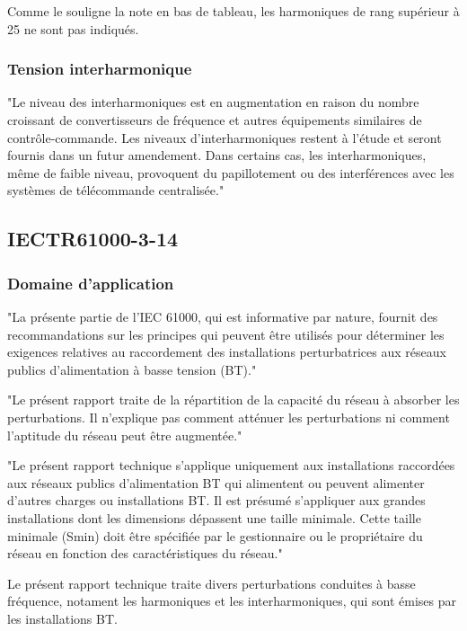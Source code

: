 Comme le souligne la note en bas de tableau, les harmoniques de rang supérieur à 25 ne sont pas indiqués.





\subsubsection{Tension interharmonique}

"Le niveau des interharmoniques est en augmentation en raison du nombre croissant de convertisseurs de fréquence et autres équipements similaires de contrôle-commande. Les niveaux d'interharmoniques restent à l'étude et seront fournis dans un futur amendement.
Dans certains cas, les interharmoniques, même de faible niveau, provoquent du papillotement ou des interférences avec les systèmes de télécommande centralisée."




\subsection{IECTR61000-3-14}


\subsubsection{Domaine d'application}
"La présente partie de l'IEC 61000, qui est informative par nature, fournit des recommandations sur les principes qui peuvent être utilisés pour déterminer les exigences relatives au raccordement des installations perturbatrices aux réseaux publics d'alimentation à basse tension (BT)."

"Le présent rapport traite de la répartition de la capacité du réseau à absorber les perturbations. Il n'explique pas comment atténuer les perturbations ni comment l'aptitude du réseau peut être augmentée."

"Le présent rapport technique s'applique uniquement aux installations raccordées aux réseaux publics d'alimentation BT qui alimentent ou peuvent alimenter d'autres charges ou installations BT. Il est présumé s'appliquer aux grandes installations dont les dimensions dépassent une taille minimale. Cette taille minimale (Smin) doit être spécifiée par le gestionnaire ou le propriétaire du réseau en fonction des caractéristiques du réseau."


Le présent rapport technique traite divers perturbations conduites à basse fréquence, notament les harmoniques et les interharmoniques, qui sont émises par les installations BT.

